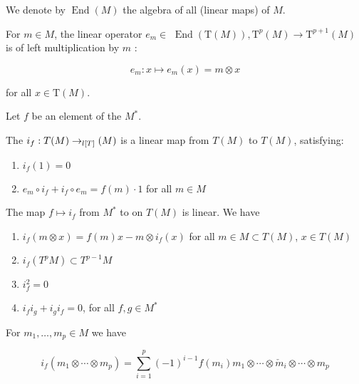\begin{definition}
    \label{antiDeriv}

    We denote by $\operatorname{End}(M)$ the algebra of all  (linear maps) of $M$.
    
    For $m \in M$, the linear operator
    $e_{m} \in$ $\operatorname{End}(\mathrm{T}(M)), \mathrm{T}^{p}(M) \rightarrow \mathrm{T}^{p+1}(M)$ is of left multiplication by $m$ :

    $$
    e_{m}: x \mapsto e_{m}(x) = m \otimes x
    $$

    for all $x \in \mathrm{T}(M)$.

    Let $f$ be an element of the  $M^{*}$.

    The  $i_{f} : T(M) \to_{l[T]}(M)$ is a linear map from $T(M)$ to $T(M)$, satisfying:

    \begin{enumerate}

    \item $i_{f}(1) = 0$
    
    \item $e_{m} \circ i_{f} + i_{f} \circ e_{m} = f(m) \cdot 1$ for all $m \in M$
    
    \end{enumerate}

    The map $f \mapsto i_{f}$ from $M^{*}$ to  on $T(M)$ is linear. We have

    \begin{enumerate}

    \item $i_{f}(m \otimes x) = f(m) x - m \otimes i_{f}(x)$ for all $m \in M \subset T(M)$, $x \in T(M)$
    
    \item $i_{f}\left( T^{p} M \right) \subset T^{p-1} M$
    
    \item $i_{f}^{2} = 0$
    
    \item $i_{f} i_{g} + i_{g} i_{f} = 0$, for all $f, g \in M^{*}$
    
    \end{enumerate}

    For $m_{1}, \ldots, m_{p} \in M$ we have

    $$
    i_{f}\left(m_{1} \otimes \cdots \otimes m_{p}\right)=\sum_{i=1}^{p}(-1)^{i-1} f\left(m_{i}\right) m_{1} \otimes \cdots \otimes \check{m}_{i} \otimes \cdots \otimes m_{p}
    $$


\end{definition}
